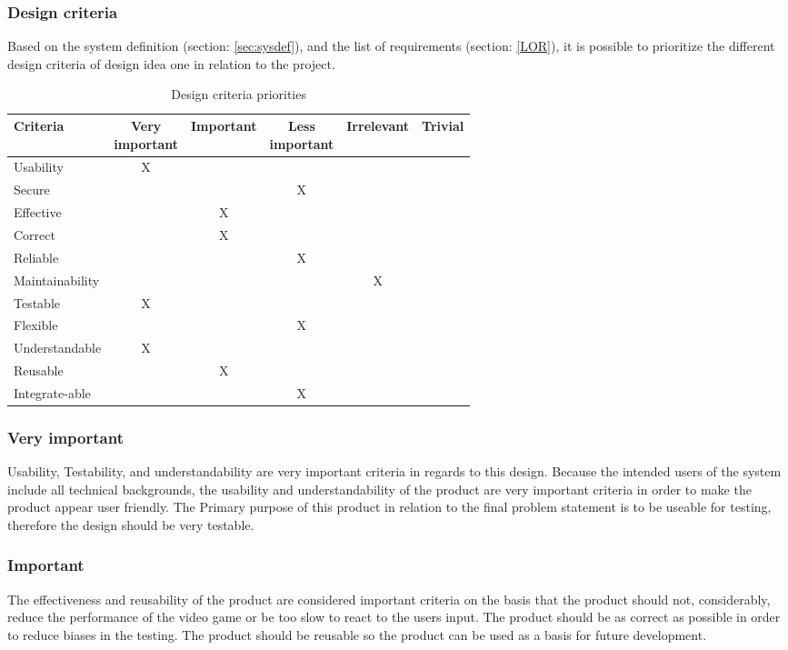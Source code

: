 \subsubsection{Design criteria}
Based on the system definition (section: \ref{sec:sysdef}), and the list of requirements (section: \ref{LOR}), it is possible to prioritize the different design criteria \parencite{Stage2001} of design idea one in relation to the project.

\begin{table}[!htbp]
\centering
\begin{tabular}{| l | c | c | c | c | c |}
\hline
Criteria & \specialcell{Very\\ important} & Important & \specialcell{Less\\ important} & Irrelevant & Trivial\\
\hline
Usability & X & & & & \\
\hline
Secure & & & X & & \\
\hline
Effective & & X & & & \\
\hline
Correct & & X & & & \\
\hline
Reliable & & & X & & \\
\hline
Maintainability & & & & X & \\
\hline
Testable & X & & & & \\
\hline
Flexible & & & X & & \\
\hline
Understandable & X & & & & \\
\hline
Reusable & & X & & & \\
\hline
Integrate-able & & & X & &\\
\hline
\end{tabular}
\caption{Design criteria priorities}\label{tab:criteria}
\end{table}

\subsubsection*{Very important}
Usability, Testability, and understandability are very important criteria in regards to this design. Because the intended users of the system include all technical backgrounds, the usability and understandability of the product are very important criteria in order to make the product appear user friendly. The Primary purpose of this product in relation to the final problem statement is to be useable for testing, therefore the design should be very testable.

\subsubsection*{Important}
The effectiveness and reusability of the product are considered important criteria on the basis that the product should not, considerably, reduce the performance of the video game or be too slow to react to the users input.  The product should be as correct as possible in order to reduce biases in the testing. The product should be reusable so the product can be used as a basis for future development.

